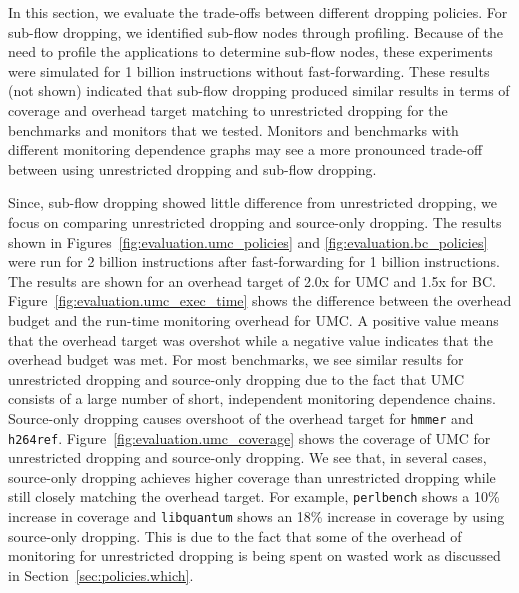 In this section, we evaluate the trade-offs between different dropping policies.
For sub-flow dropping, we identified sub-flow nodes through profiling. Because
of the need to profile the applications to determine sub-flow nodes, these
experiments were simulated for 1 billion instructions without fast-forwarding.
These results (not shown) indicated that sub-flow dropping produced similar
results in terms of coverage and overhead target matching to unrestricted
dropping for the benchmarks and monitors that we tested. Monitors and
benchmarks with different monitoring dependence graphs may see a more
pronounced trade-off between using unrestricted dropping and sub-flow dropping.

Since, sub-flow dropping showed little difference from unrestricted dropping,
we focus on comparing unrestricted dropping and source-only dropping. The
results shown in Figures~\ref{fig:evaluation.umc_policies} and
\ref{fig:evaluation.bc_policies} were run for 2 billion instructions after
fast-forwarding for 1 billion instructions.
The results are shown for an overhead target of 2.0x for UMC and 1.5x for BC.
Figure~\ref{fig:evaluation.umc_exec_time} shows the difference between the
overhead budget and the run-time monitoring overhead for UMC. A positive value
means that the overhead target was overshot while a negative value indicates
that the overhead budget was met. For most benchmarks, we see similar results for unrestricted
dropping and source-only dropping due to the fact that UMC consists of a large
number of short, independent monitoring dependence chains. Source-only dropping
causes overshoot of the overhead target for {\tt hmmer} and {\tt h264ref}.
Figure~\ref{fig:evaluation.umc_coverage} shows the coverage of UMC for
unrestricted dropping and source-only dropping. We see that, in several cases, source-only dropping
achieves higher coverage than unrestricted dropping while still closely matching the overhead target. For example, {\tt perlbench} shows a 10\% increase in coverage and {\tt libquantum} shows an 18\% increase in coverage by using source-only dropping. This is due
to the fact that some of the overhead of monitoring for unrestricted dropping
is being spent on wasted work as discussed in Section~\ref{sec:policies.which}.

